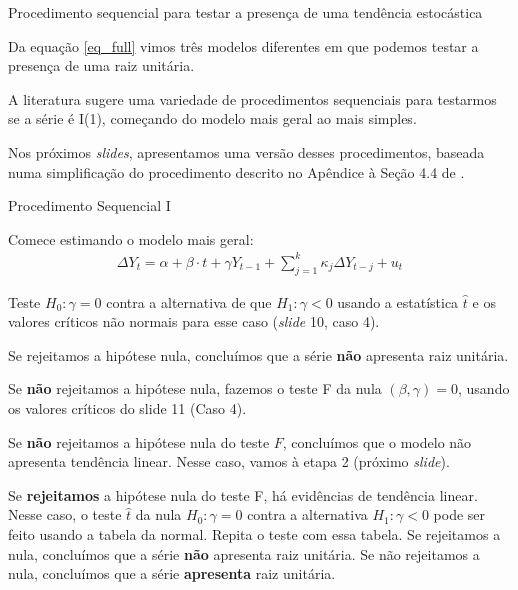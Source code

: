 \documentclass[11pt]{beamer}
\newenvironment{wideitemize}{\itemize\addtolength{\itemsep}{10pt}}{\enditemize}
\newenvironment{wideenumerate}{\enumerate\addtolength{\itemsep}{10pt}}{\endenumerate}
\newenvironment{halfwideenumerate}{\enumerate\addtolength{\itemsep}{0.5em}}{\endenumerate}
\begin{document}
\begin{frame}{Procedimento sequencial para testar a presença de uma tendência estocástica}
	\begin{wideitemize}
		\item Da equação \eqref{eq_full} vimos três modelos diferentes em que podemos testar a presença de uma raiz unitária.
		\item A literatura sugere uma variedade de procedimentos {\color{blue}sequenciais} para testarmos se a série é I(1), começando do modelo mais geral ao mais simples.
		\item Nos próximos \textit{slides}, apresentamos uma versão desses procedimentos, baseada numa simplificação do procedimento descrito no Apêndice à Seção 4.4 de \citet{Enders2014}.
		
	\end{wideitemize}
\end{frame}

\begin{frame}{Procedimento Sequencial I}
	\begin{wideenumerate}
		\item Comece estimando o modelo mais geral:
		\begin{equation*}
			\begin{aligned}
				\Delta Y_t = \alpha + \beta \cdot t + \gamma Y_{t-1}  +\sum_{j=1}^k \kappa_j\Delta Y_{t-j} + u_t
			\end{aligned}
		\end{equation*}
		
		Teste $H_0: \gamma = 0$ contra a alternativa de que $H_1: \gamma < 0$ usando a estatística $\hat{t}$ e os valores críticos não normais para esse caso (\textit{slide} 10, caso 4).
		\begin{halfwideenumerate}
			\item Se rejeitamos a hipótese nula, concluímos que a série \textbf{não} apresenta raiz unitária.
			\item Se \textbf{não} rejeitamos a hipótese nula, fazemos o teste F da nula $(\beta, \gamma)=0$, usando os valores críticos do slide 11 (Caso 4).
			\begin{halfwideenumerate}
				\item Se \textbf{não} rejeitamos a hipótese  nula do teste $F$, concluímos que o modelo não apresenta tendência linear. Nesse caso, vamos à etapa 2 (próximo \textit{slide}).
				\item Se \textbf{rejeitamos} a hipótese nula do teste F, há evidências de tendência linear. Nesse caso, o teste $\hat{t}$ da nula $H_0: \gamma = 0$ contra a alternativa  $H_1: \gamma < 0$ pode ser feito usando a tabela da normal. Repita o teste com essa tabela. Se rejeitamos a nula, concluímos que a série \textbf{não} apresenta raiz unitária. Se não rejeitamos a nula, concluímos que a série \textbf{apresenta} raiz unitária.
			\end{halfwideenumerate}
		\end{halfwideenumerate}
		
	\end{wideenumerate}
	
\end{frame}
\end{document}
